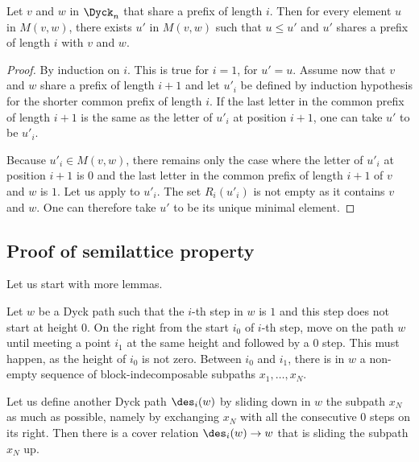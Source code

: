 \begin{lemma}
  \label{meet_with_prefix}
  Let $v$ and $w$ in $\Dyck_n$ that share a prefix of length $i$. Then
  for every element $u$ in $M(v,w)$, there exists $u'$ in $M(v,w)$
  such that $u \leq u'$ and $u'$ shares a prefix of length $i$ with $v$
  and $w$.
\end{lemma}
\begin{proof}
  By induction on $i$. This is true for $i=1$, for $u'=u$. Assume now
  that $v$ and $w$ share a prefix of length $i+1$ and let $u'_i$
  be defined by induction hypothesis for the shorter common prefix of
  length $i$. If the last letter in the common prefix of length $i+1$
  is the same as the letter of $u'_i$ at position $i+1$, one can take
  $u'$ to be $u'_i$.

  Because $u'_i \in M(v,w)$, there remains only the case where the
  letter of $u'_i$ at position $i+1$ is $0$ and the last letter in the
  common prefix of length $i+1$ of $v$ and $w$ is $1$. Let us apply
   to $u'_i$. The set $R_{i}(u'_i)$ is not empty as
  it contains $v$ and $w$. One can therefore take $u'$ to be its unique
  minimal element.
\end{proof}

\subsection{Proof of semilattice property}

\label{proof_semi}

Let us start with more lemmas.

Let $w$ be a Dyck path such that the $i$-th step in $w$ is $1$ and
this step does not start at height $0$.  On the right from the start
$i_0$ of $i$-th step, move on the path $w$ until meeting a point $i_1$
at the same height and followed by a $0$ step. This must happen, as
the height of $i_0$ is not zero. Between $i_0$ and $i_1$, there is in
$w$ a non-empty sequence of block-indecomposable subpaths $x_1, \dots, x_N$.

Let us define another Dyck path $\des_i(w)$ by sliding down in $w$ the
subpath $x_N$ as much as possible, namely by exchanging $x_N$ with all
the consecutive $0$ steps on its right. Then there is a cover relation
$\des_i(w) \to w$ that is sliding the subpath $x_N$ up.


